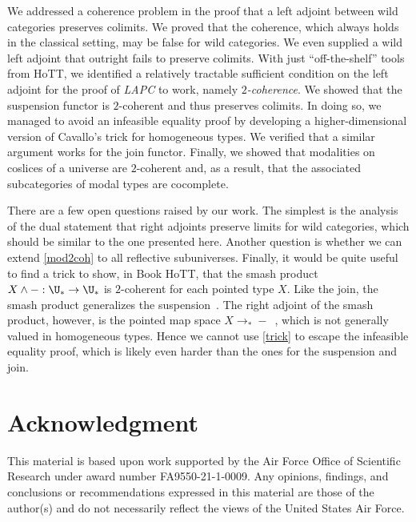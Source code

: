 We addressed a coherence problem in the proof that a left adjoint between wild categories preserves colimits. We proved that the coherence, which always holds in the classical setting, may be false for wild categories. We even supplied a wild left adjoint that outright fails to preserve colimits. With just ``off-the-shelf'' tools from HoTT, we identified a relatively tractable sufficient condition on the left adjoint for the proof of \emph{LAPC} to work, namely \emph{$2$-coherence}. We showed that the suspension functor is $2$-coherent and thus preserves colimits. In doing so, we managed to avoid an infeasible equality proof by developing a higher-dimensional version of Cavallo's trick for homogeneous types. We verified that a similar argument works for the join functor. Finally, we showed that modalities on coslices of a universe are $2$-coherent and, as a result, that the associated subcategories of modal types are cocomplete.

There are a few open questions raised by our work. The simplest is the analysis of the dual statement that right adjoints preserve limits for wild categories, which should be similar to the one presented here. Another question is whether we can extend \autoref{mod2coh} to all reflective subuniverses.
Finally, it would be quite useful to find a trick to show, in Book HoTT, that the smash product $X \land {-} : \U_{\ast} \to \U_{\ast}$ is $2$-coherent for each pointed type $X$. Like the join, the smash product generalizes the suspension~\cite[Proposition 4.2.1]{brunthesis}. The right adjoint of the smash product, however, is the pointed map space $X \to_{\ast} {-}$~\cite[Theorem 4.3.28]{vanDoornthesis}, which is not generally valued in homogeneous types. Hence we cannot use \autoref{trick} to escape the infeasible equality proof, which is likely even harder than the ones for the suspension and join.

\section*{Acknowledgment}
This material is based upon work supported by the Air Force Office of Scientific Research under award number FA9550-21-1-0009.
Any opinions, findings, and conclusions or recommendations expressed in this material are those of the author(s) and do not
necessarily reflect the views of the United States Air Force.

